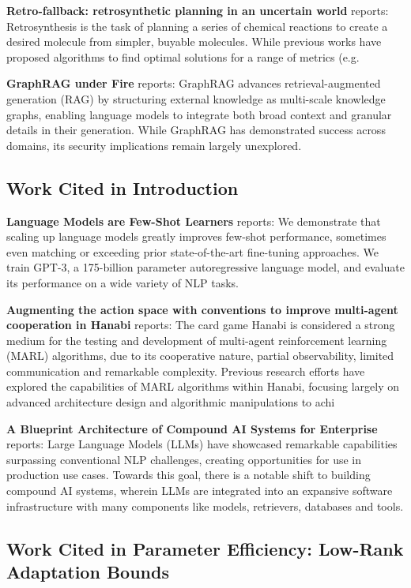 \documentclass[10pt,journal,compsoc,twocolumn]{IEEEtran}
\begin{document}
\textbf{Retro-fallback: retrosynthetic planning in an uncertain world} \cite{arxiv_2310_09270} reports: Retrosynthesis is the task of planning a series of chemical reactions to create a desired molecule from simpler, buyable molecules. While previous works have proposed algorithms to find optimal solutions for a range of metrics (e.g.

\textbf{GraphRAG under Fire} \cite{arxiv_2501_14050} reports: GraphRAG advances retrieval-augmented generation (RAG) by structuring external knowledge as multi-scale knowledge graphs, enabling language models to integrate both broad context and granular details in their generation. While GraphRAG has demonstrated success across domains, its security implications remain largely unexplored.


\subsection{Work Cited in Introduction}


\textbf{Language Models are Few-Shot Learners} \cite{arxiv_2005_14165} reports: We demonstrate that scaling up language models greatly improves few-shot performance, sometimes even matching or exceeding prior state-of-the-art fine-tuning approaches. We train GPT-3, a 175-billion parameter autoregressive language model, and evaluate its performance on a wide variety of NLP tasks.

\textbf{Augmenting the action space with conventions to improve multi-agent cooperation in Hanabi} \cite{arxiv_2412_06333} reports: The card game Hanabi is considered a strong medium for the testing and development of multi-agent reinforcement learning (MARL) algorithms, due to its cooperative nature, partial observability, limited communication and remarkable complexity. Previous research efforts have explored the capabilities of MARL algorithms within Hanabi, focusing largely on advanced architecture design and algorithmic manipulations to achi

\textbf{A Blueprint Architecture of Compound AI Systems for Enterprise} \cite{arxiv_2406_00584} reports: Large Language Models (LLMs) have showcased remarkable capabilities surpassing conventional NLP challenges, creating opportunities for use in production use cases. Towards this goal, there is a notable shift to building compound AI systems, wherein LLMs are integrated into an expansive software infrastructure with many components like models, retrievers, databases and tools.


\subsection{Work Cited in Parameter Efficiency: Low-Rank Adaptation Bounds}
\end{document}
